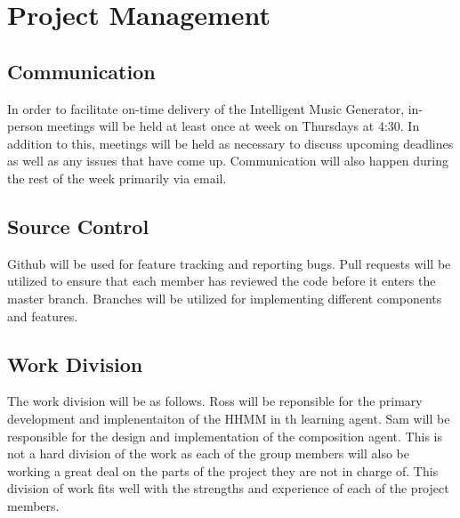 \documentclass{article}
\begin{document}
\section{Project Management}
\subsection{Communication}
In order to facilitate on-time delivery of the Intelligent Music Generator, in-person meetings 
will be held at least once at week on Thursdays at 4:30. In addition to this, meetings will be 
held as necessary to discuss upcoming deadlines as well as any issues that have come up. 
Communication will also happen during the rest of the week primarily via email.


\subsection{Source Control}
Github will be used for feature tracking and reporting bugs.  Pull requests will be utilized to 
ensure that each member has reviewed the code before it enters the master branch.  Branches will 
be utilized for implementing different components and features.

\subsection{Work Division}
The work division will be as follows. Ross will be reponsible for the primary development and 
implenentaiton of the HHMM in th learning agent. Sam will be responsible for the design and 
implementation of the composition agent. This is not a hard division of the work as each of 
the group members will also be working a great deal on the parts of the project they are not in
charge of. This division of work fits well with the strengths and experience of each of the 
project members.
\end{document}
